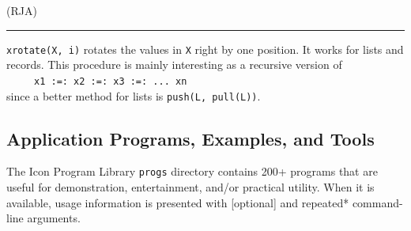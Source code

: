 (RJA)

\vspace{0.25cm}\hrule{}

\texttt{xrotate(X, i)} rotates the values in \texttt{X} right by one
position. It works for lists and records. This procedure is mainly
interesting as a recursive version of\\
 \ \ \ \ \ \texttt{x1 :=: x2 :=: x3 :=: ... xn\\
}since a better method for lists is \texttt{push(L, pull(L))}. 

\clearpage\subsection{Application Programs, Examples, and Tools}

The Icon Program Library \texttt{progs} directory contains 200+ programs
that are useful for demonstration, entertainment, and/or practical
utility. When it is available, usage information is presented with
[optional] and repeated* command-line arguments.

